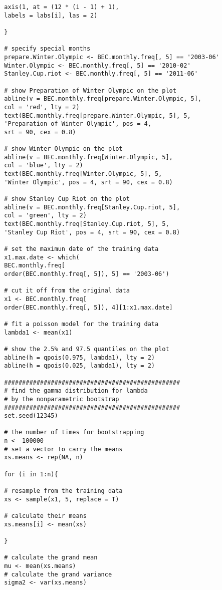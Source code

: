 \begin{enumerate}
\begin{verbatim}
		axis(1, at = (12 * (i - 1) + 1), 
		labels = labs[i], las = 2)
		
		}
		
		# specify special months
		prepare.Winter.Olympic <- BEC.monthly.freq[, 5] == '2003-06'
		Winter.Olympic <- BEC.monthly.freq[, 5] == '2010-02'
		Stanley.Cup.riot <- BEC.monthly.freq[, 5] == '2011-06'
		
		# show Preparation of Winter Olympic on the plot
		abline(v = BEC.monthly.freq[prepare.Winter.Olympic, 5], 
		col = 'red', lty = 2)
		text(BEC.monthly.freq[prepare.Winter.Olympic, 5], 5, 
		'Preparation of Winter Olympic', pos = 4, 
		srt = 90, cex = 0.8)
		
		# show Winter Olympic on the plot 
		abline(v = BEC.monthly.freq[Winter.Olympic, 5], 
		col = 'blue', lty = 2)
		text(BEC.monthly.freq[Winter.Olympic, 5], 5, 
		'Winter Olympic', pos = 4, srt = 90, cex = 0.8)
		
		# show Stanley Cup Riot on the plot 
		abline(v = BEC.monthly.freq[Stanley.Cup.riot, 5], 
		col = 'green', lty = 2)
		text(BEC.monthly.freq[Stanley.Cup.riot, 5], 5, 
		'Stanley Cup Riot', pos = 4, srt = 90, cex = 0.8)
		
		# set the maximun date of the training data
		x1.max.date <- which(
		BEC.monthly.freq[
		order(BEC.monthly.freq[, 5]), 5] == '2003-06')
		
		# cut it off from the original data
		x1 <- BEC.monthly.freq[
		order(BEC.monthly.freq[, 5]), 4][1:x1.max.date]
		
		# fit a poisson model for the training data
		lambda1 <- mean(x1)
		
		# show the 2.5% and 97.5 quantiles on the plot
		abline(h = qpois(0.975, lambda1), lty = 2)
		abline(h = qpois(0.025, lambda1), lty = 2)
		
		#################################################
		# find the gamma distribution for lambda 
		# by the nonparametric bootstrap
		#################################################
		set.seed(12345)
		
		# the number of times for bootstrapping
		n <- 100000
		# set a vector to carry the means
		xs.means <- rep(NA, n)
		
		for (i in 1:n){
		
		# resample from the training data
		xs <- sample(x1, 5, replace = T)
		
		# calculate their means
		xs.means[i] <- mean(xs)
		
		}
		
		# calculate the grand mean
		mu <- mean(xs.means)
		# calculate the grand variance
		sigma2 <- var(xs.means)
		

\end{verbatim}
\end{enumerate}
